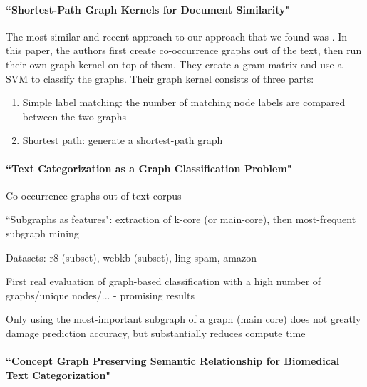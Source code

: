 \paragraph{``Shortest-Path Graph Kernels for Document Similarity" \cite{Nikolentzos2017a}}
The most similar and recent approach to our approach that we found was \cite{Nikolentzos2017a}. In this paper, the authors first create co-occurrence graphs out of the text, then run their own graph kernel on top of them. They create a gram matrix and use a SVM to classify the graphs. Their graph kernel consists of three parts:
\begin{enumerate}
\item{Simple label matching: the number of matching node labels are compared between the two graphs}
\item{Shortest path: generate a shortest-path graph}
\end{enumerate}

\paragraph{``Text Categorization as a Graph Classification Problem" \cite{Rousseau2015a}}
Co-occurrence graphs out of text corpus

``Subgraphs as features": extraction of k-core (or main-core), then most-frequent subgraph mining

Datasets: r8 (subset), webkb (subset), ling-spam, amazon

First real evaluation of graph-based classification with a high number of graphs/unique nodes/... - promising results

Only using the most-important subgraph of a graph (main core) does not greatly damage prediction accuracy, but substantially reduces compute time

\paragraph{``Concept Graph Preserving Semantic Relationship for Biomedical Text Categorization" \cite{Gulrandhe2015}}
